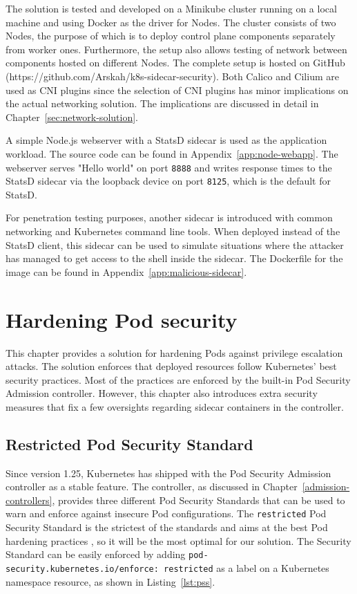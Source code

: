 \documentclass[english, 12pt, a4paper, sci, utf8, a-2b, online]{aaltothesis}
\begin{document}
The solution is tested and developed on a Minikube cluster running on a local machine and using Docker as the driver for Nodes.
The cluster consists of two Nodes, the purpose of which is to deploy control plane components separately from worker ones.
Furthermore, the setup also allows testing of network between components hosted on different Nodes.
The complete setup is hosted on GitHub (https://github.com/Arskah/k8s-sidecar-security).
Both Calico and Cilium are used as CNI plugins since the selection of CNI plugins has minor implications on the actual networking solution. %
The implications are discussed in detail in Chapter~\ref{sec:network-solution}.

A simple Node.js webserver with a StatsD sidecar is used as the application workload.
The source code can be found in Appendix~\ref{app:node-webapp}.
The webserver serves "Hello world" on port \lstinline{8888} and writes response times to the StatsD sidecar via the loopback device on port \lstinline{8125}, which is the default for StatsD.

For penetration testing purposes, another sidecar is introduced with common networking and Kubernetes command line tools.
When deployed instead of the StatsD client, this sidecar can be used to simulate situations where the attacker has managed to get access to the shell inside the sidecar.
The Dockerfile for the image can be found in Appendix~\ref{app:malicious-sidecar}.

\clearpage

\section{Hardening Pod security} \label{sec:pod-hardening}

This chapter provides a solution for hardening Pods against privilege escalation attacks.
The solution enforces that deployed resources follow Kubernetes' best security practices.
Most of the practices are enforced by the built-in Pod Security Admission controller.
However, this chapter also introduces extra security measures that fix a few oversights regarding sidecar containers in the controller.

\subsection{Restricted Pod Security Standard}

Since version 1.25, Kubernetes has shipped with the Pod Security Admission controller as a stable feature.
The controller, as discussed in Chapter~\ref{admission-controllers}, provides three different Pod Security Standards that can be used to warn and enforce against insecure Pod configurations.
The \lstinline{restricted} Pod Security Standard is the strictest of the standards and aims at the best Pod hardening practices \cite{k8s-docs-pss}, so it will be the most optimal for our solution.
The Security Standard can be easily enforced by adding \lstinline{pod-security.kubernetes.io/enforce: restricted} as a label on a Kubernetes namespace resource, as shown in Listing~\ref{lst:pss}.
\end{document}
